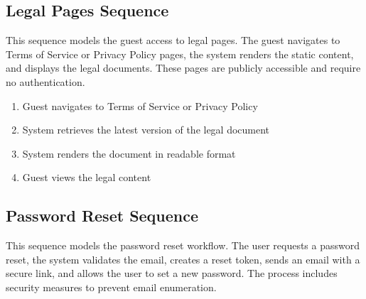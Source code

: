 %

\subsection{Legal Pages Sequence}
This sequence models the guest access to legal pages. The guest navigates to
Terms of Service or Privacy Policy pages, the system renders the static
content, and displays the legal documents. These pages are publicly accessible
and require no authentication.

\begin{enumerate}[topsep=0pt,itemsep=1pt,parsep=0pt,partopsep=0pt]
    \item Guest navigates to Terms of Service or Privacy Policy
    \item System retrieves the latest version of the legal document
    \item System renders the document in readable format
    \item Guest views the legal content
\end{enumerate}

%

\subsection{Password Reset Sequence}
This sequence models the password reset workflow. The user requests a password
reset, the system validates the email, creates a reset token, sends an email
with a secure link, and allows the user to set a new password. The process
includes security measures to prevent email enumeration.

